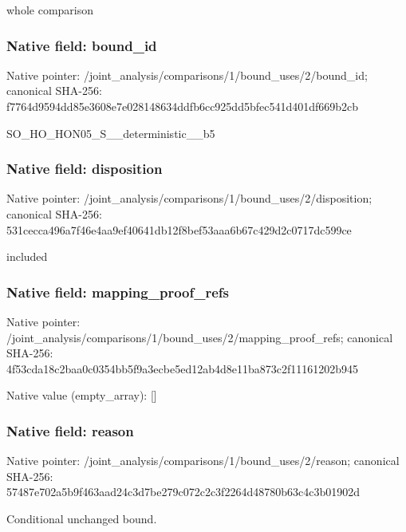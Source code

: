 \documentclass[10pt,a4paper]{article}
\begin{document}
\begingroup\raggedright\sloppy whole comparison\par\endgroup

\subsubsection{Native field: bound\_\allowbreak{}id}
Native pointer: /joint\_\allowbreak{}analysis/comparisons/1/bound\_\allowbreak{}uses/2/bound\_\allowbreak{}id; canonical SHA-256: f7764d9594dd85e3608e7e028148634ddfb6cc925dd5bfec541d401df669b2cb

\begingroup\raggedright\sloppy SO\_\allowbreak{}HO\_\allowbreak{}HON05\_\allowbreak{}S\_\allowbreak{}\_\allowbreak{}deterministic\_\allowbreak{}\_\allowbreak{}b5\par\endgroup

\subsubsection{Native field: disposition}
Native pointer: /joint\_\allowbreak{}analysis/comparisons/1/bound\_\allowbreak{}uses/2/disposition; canonical SHA-256: 531cecca496a7f46e4aa9ef40641db12f8bef53aaa6b67c429d2c0717dc599ce

\begingroup\raggedright\sloppy included\par\endgroup

\subsubsection{Native field: mapping\_\allowbreak{}proof\_\allowbreak{}refs}
Native pointer: /joint\_\allowbreak{}analysis/comparisons/1/bound\_\allowbreak{}uses/2/mapping\_\allowbreak{}proof\_\allowbreak{}refs; canonical SHA-256: 4f53cda18c2baa0c0354bb5f9a3ecbe5ed12ab4d8e11ba873c2f11161202b945

Native value (empty\_\allowbreak{}array): []

\subsubsection{Native field: reason}
Native pointer: /joint\_\allowbreak{}analysis/comparisons/1/bound\_\allowbreak{}uses/2/reason; canonical SHA-256: 57487e702a5b9f463aad24c3d7be279c072c2c3f2264d48780b63c4c3b01902d

\begingroup\raggedright\sloppy Conditional unchanged bound.\par\endgroup
\end{document}
